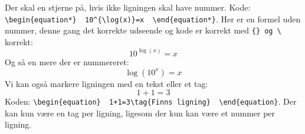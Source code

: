 \documentclass{article}
\begin{document}
Der skal en stjerne på, hvis ikke ligningen skal have nummer. Kode: \verb"\begin{equation*}  10^{\log(x)}=x  \end{equation*}". Her er en formel uden nummer, denne gang det korrekte udseende og kode er korrekt med \verb"{} og \" korrekt:
\begin{equation*}  
10^{\log(x)}=x  
\end{equation*}
Og så en mere der er nummereret:
\begin{equation}
\log{(10^x)}=x
\end{equation}
Vi kan også markere ligningen med en tekst eller et tag: 
\begin{equation}
1+1=3\tag{Finns ligning}
\end{equation}
Koden: \verb"\begin{equation}  1+1=3\tag{Finns ligning}  \end{equation}". Der kan kun være en tag per ligning, ligesom der kun kan være et nummer per ligning.
\end{document}

